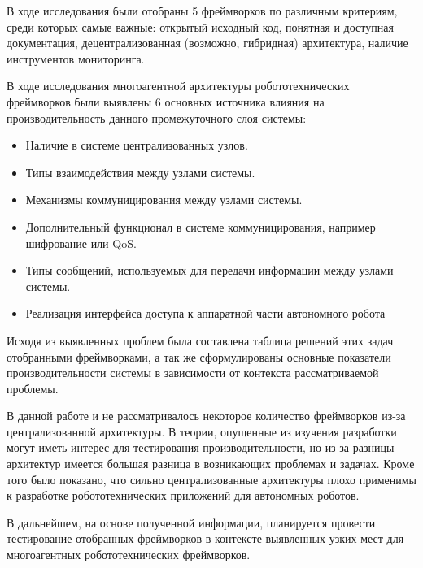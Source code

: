 В ходе исследования были отобраны 5 фреймворков по различным критериям, среди которых самые важные: открытый исходный код, понятная и доступная документация, децентрализованная (возможно, гибридная) архитектура, наличие инструментов мониторинга.

В ходе исследования многоагентной архитектуры робототехнических фреймворков были выявлены 6 основных источника влияния на производительность данного промежуточного слоя системы:

\begin{itemize}
	\item Наличие в системе централизованных узлов.
	\item Типы взаимодействия между узлами системы.
	\item Механизмы коммуницирования между узлами системы.
	\item Дополнительный функционал в системе коммуницирования, например шифрование или QoS.
	\item Типы сообщений, используемых для передачи информации между узлами системы.
	\item Реализация интерфейса доступа к аппаратной части автономного робота
\end{itemize}


Исходя из выявленных проблем была составлена таблица решений этих задач отобранными фреймворками, а так же сформулированы основные показатели производительности системы в зависимости от контекста рассматриваемой проблемы.

В данной работе и не рассматривалось некоторое количество фреймворков из-за централизованной архитектуры. В теории, опущенные из изучения разработки могут иметь интерес для тестирования производительности, но из-за разницы архитектур имеется большая разница в возникающих проблемах и задачах. Кроме того было показано, что сильно централизованные архитектуры плохо применимы к разработке робототехнических приложений для автономных роботов.

В дальнейшем, на основе полученной информации, планируется провести тестирование отобранных фреймворков в контексте выявленных узких мест для многоагентных робототехнических фреймворков.